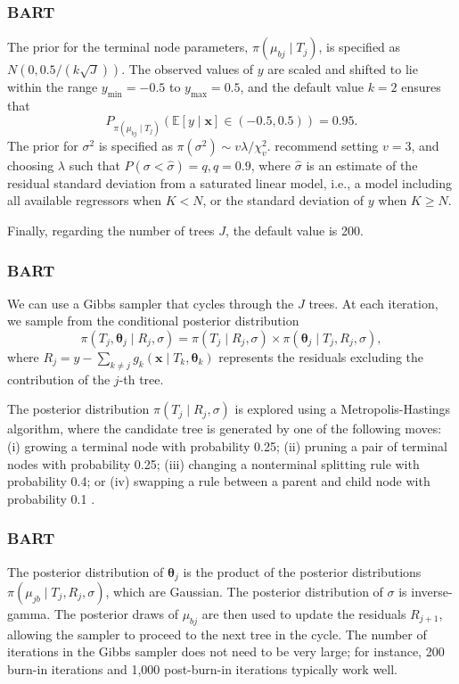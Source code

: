 \documentclass[12pt, compress]{beamer}
\begin{document}
\begin{frame}
	\frametitle{BART}
The prior for the terminal node parameters, \( \pi(\mu_{bj} \mid T_j) \), is specified as \( N(0, 0.5 / (k \sqrt{J})) \). The observed values of \( y \) are scaled and shifted to lie within the range \( y_{\text{min}} = -0.5 \) to \( y_{\text{max}} = 0.5 \), and the default value \( k = 2 \) ensures that  
\[
P_{\pi(\mu_{bj} \mid T_j)}\left(\mathbb{E}[y \mid \mathbf{x}] \in (-0.5, 0.5)\right) = 0.95.
\]
The prior for \( \sigma^2 \) is specified as \( \pi(\sigma^2) \sim v\lambda / \chi^2_v \). \cite{chipman2010bart} recommend setting \( v = 3 \), and choosing \( \lambda \) such that \( P(\sigma < \hat{\sigma}) = q, q = 0.9 \), where \( \hat{\sigma} \) is an estimate of the residual standard deviation from a saturated linear model, i.e., a model including all available regressors when \( K < N \), or the standard deviation of \( y \) when \( K \geq N \). 

Finally, regarding the number of trees \( J \), the default value is 200.
\end{frame}

\begin{frame}
	\frametitle{BART}
We can use a Gibbs sampler that cycles through the \( J \) trees. At each iteration, we sample from the conditional posterior distribution
\[
\pi(T_j, \boldsymbol{\theta}_j \mid R_j, \sigma) = \pi(T_j \mid R_j, \sigma) \times \pi(\boldsymbol{\theta}_j \mid T_j, R_j, \sigma),
\]
where \( R_j = y - \sum_{k \neq j} g_k(\mathbf{x} \mid T_k, \boldsymbol{\theta}_k) \) represents the residuals excluding the contribution of the \( j \)-th tree.

The posterior distribution \( \pi(T_j \mid R_j, \sigma) \) is explored using a Metropolis-Hastings algorithm, where the candidate tree is generated by one of the following moves: (i) growing a terminal node with probability 0.25; (ii) pruning a pair of terminal nodes with probability 0.25; (iii) changing a nonterminal splitting rule with probability 0.4; or (iv) swapping a rule between a parent and child node with probability 0.1 \citep{chipman1998bayesian}.
\end{frame}

\begin{frame}
	\frametitle{BART}
The posterior distribution of \( \boldsymbol{\theta}_j \) is the product of the posterior distributions \( \pi(\mu_{jb} \mid T_j, R_j, \sigma) \), which are Gaussian. The posterior distribution of \( \sigma \) is inverse-gamma. The posterior draws of \( \mu_{bj} \) are then used to update the residuals \( R_{j+1} \), allowing the sampler to proceed to the next tree in the cycle. The number of iterations in the Gibbs sampler does not need to be very large; for instance, 200 burn-in iterations and 1,000 post-burn-in iterations typically work well.
\end{frame}
\end{document}
